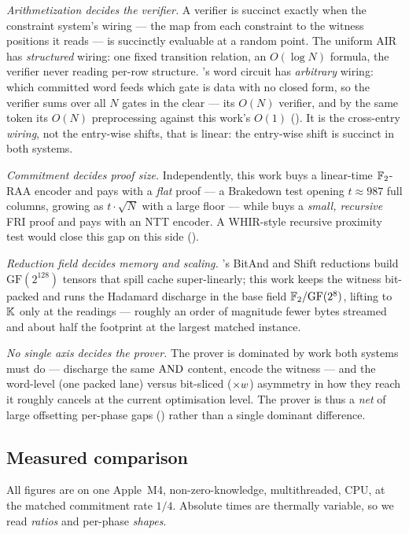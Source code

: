 \emph{Arithmetization decides the verifier.} A verifier is succinct exactly when
the constraint system's wiring --- the map from each constraint to the witness
positions it reads --- is succinctly evaluable at a random point. The uniform AIR
has \emph{structured} wiring: one fixed transition relation, an $O(\log N)$
formula, the verifier never reading per-row structure. \binius{}'s word circuit
has \emph{arbitrary} wiring: which committed word feeds which gate is data with no
closed form, so the verifier sums over all $N$ gates in the clear --- its $O(N)$
verifier, and by the same token its $O(N)$ preprocessing against this work's
$O(1)$ (). It is the cross-entry \emph{wiring}, not the entry-wise
shifts, that is linear: the entry-wise shift is succinct in both systems.

\emph{Commitment decides proof size.} Independently, this work buys a
linear-time $\mathbb{F}_2$-RAA encoder and pays with a \emph{flat} proof --- a Brakedown
test opening $t\approx 987$ full columns, growing as $t\cdot\sqrt N$ with a large
floor --- while \binius{} buys a \emph{small, recursive} FRI proof and pays with
an NTT encoder. A WHIR-style recursive proximity test would close this gap on
this side ().

\emph{Reduction field decides memory and scaling.} \binius{}'s BitAnd and Shift
reductions build $\mathrm{GF}(2^{128})$ tensors that spill cache super-linearly;
this work keeps the witness bit-packed and runs the Hadamard discharge in the
base field $\mathbb{F}_2/\mathrm{GF}(2^8)$, lifting to $\mathbb{K}$ only at the readings ---
roughly an order of magnitude fewer bytes streamed and about half the footprint
at the largest matched instance.

\emph{No single axis decides the prover.} The prover is dominated by work both
systems must do --- discharge the same $\operatorname{AND}$ content, encode the witness --- and
the word-level (one packed lane) versus bit-sliced ($\times w$) asymmetry in
how they reach it roughly cancels at the current optimisation level. The prover
is thus a \emph{net} of large offsetting per-phase gaps () rather
than a single dominant difference.

\subsection{Measured comparison}
\label{sec:results}

All figures are on one Apple~M4, non-zero-knowledge, multithreaded, CPU, at the
matched commitment rate $1/4$. Absolute times are thermally variable, so we read
\emph{ratios} and per-phase \emph{shapes}.

